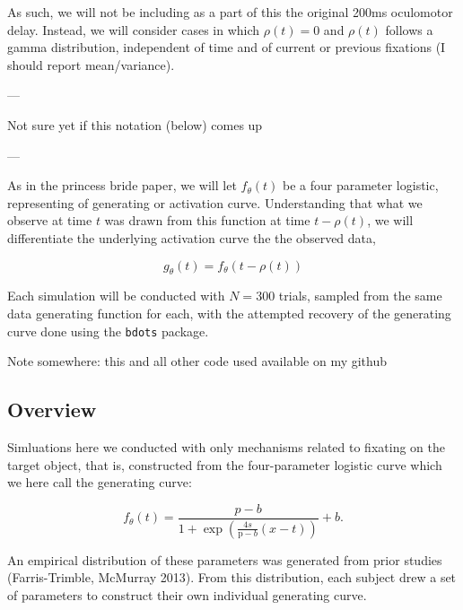 \documentclass{article}
\newcommand{\xt}{\texttt}%
\begin{document}
As such, we will not be including as a part of this the original 200ms oculomotor delay. Instead, we will consider cases in which $\rho(t) = 0$ and $\rho(t)$ follows a gamma distribution, independent of time and of current or previous fixations (I should report mean/variance).

---

Not sure yet if this notation (below) comes up

---

As in the princess bride paper, we will let $f_{\theta}(t)$ be a four parameter logistic, representing of generating or activation curve. Understanding that what we observe at time $t$ was drawn from this function at time $t - \rho(t)$, we will differentiate the underlying activation curve the the observed data, 

\begin{equation}
g_{\theta}(t) = f_{\theta}(t - \rho(t))
\end{equation}


Each simulation will be conducted with $N = 300$ trials, sampled from the same data generating function for each, with the attempted recovery of the generating curve done using the \xt{bdots} package. 

Note somewhere: this and all other code used available on my github

\subsection{Overview}

Simluations here we conducted with only mechanisms related to fixating on the target object, that is, constructed from the four-parameter logistic curve which we here call the generating curve: 

\begin{equation}
f_{\theta}(t) = \frac{p-b}{1 + \exp \left(\frac{4s}{\text{p}-b} (x - t) \right)} + b.
\end{equation}

An empirical distribution of these parameters was generated from prior studies (Farris-Trimble, McMurray 2013). From this distribution, each subject drew a set of parameters to construct their own individual generating curve.
\end{document}
